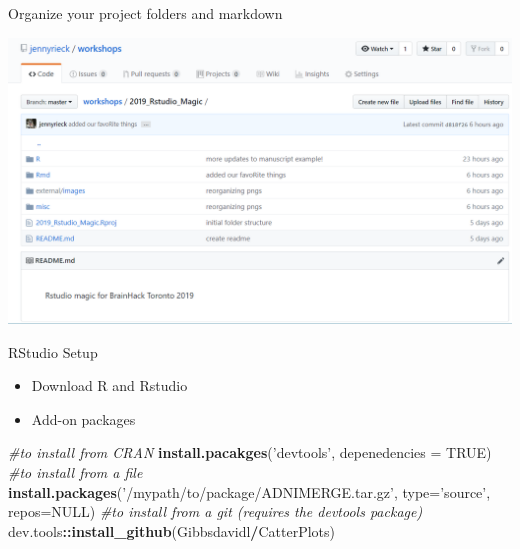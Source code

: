 \documentclass[
  ignorenonframetext,
]{beamer}
\newenvironment{Shaded}{\begin{snugshade}}{\end{snugshade}}
\newcommand{\CommentTok}[1]{\textcolor[rgb]{0.56,0.35,0.01}{\textit{#1}}}
\newcommand{\DataTypeTok}[1]{\textcolor[rgb]{0.13,0.29,0.53}{#1}}
\newcommand{\KeywordTok}[1]{\textcolor[rgb]{0.13,0.29,0.53}{\textbf{#1}}}
\newcommand{\NormalTok}[1]{#1}
\newcommand{\OperatorTok}[1]{\textcolor[rgb]{0.81,0.36,0.00}{\textbf{#1}}}
\newcommand{\OtherTok}[1]{\textcolor[rgb]{0.56,0.35,0.01}{#1}}
\newcommand{\StringTok}[1]{\textcolor[rgb]{0.31,0.60,0.02}{#1}}
\providecommand{\tightlist}{%
  \setlength{\itemsep}{0pt}\setlength{\parskip}{0pt}}
\begin{document}
\begin{frame}{Organize your project folders and markdown}
\protect\hypertarget{organize-your-project-folders-and-markdown-1}{}

\includegraphics{../external/images/setup_5_git.PNG}

\end{frame}

\begin{frame}[fragile]{RStudio Setup}
\protect\hypertarget{rstudio-setup-1}{}

\begin{itemize}
\tightlist
\item
  Download R and Rstudio
\item
  Add-on packages
\end{itemize}

\begin{Shaded}
\begin{Highlighting}[]
\CommentTok{#to install from CRAN}
\KeywordTok{install.pacakges}\NormalTok{(}\StringTok{'devtools'}\NormalTok{, }\DataTypeTok{depenedencies =} \OtherTok{TRUE}\NormalTok{)}
\CommentTok{#to install from a file}
\KeywordTok{install.packages}\NormalTok{(}\StringTok{'/mypath/to/package/ADNIMERGE.tar.gz'}\NormalTok{, }
                 \DataTypeTok{type=}\StringTok{'source'}\NormalTok{, }\DataTypeTok{repos=}\OtherTok{NULL}\NormalTok{) }
\CommentTok{#to install from a git  (requires the devtools package)}
\NormalTok{dev.tools}\OperatorTok{::}\KeywordTok{install_github}\NormalTok{(Gibbsdavidl}\OperatorTok{/}\NormalTok{CatterPlots) }
\end{Highlighting}
\end{Shaded}

\end{frame}
\end{document}
